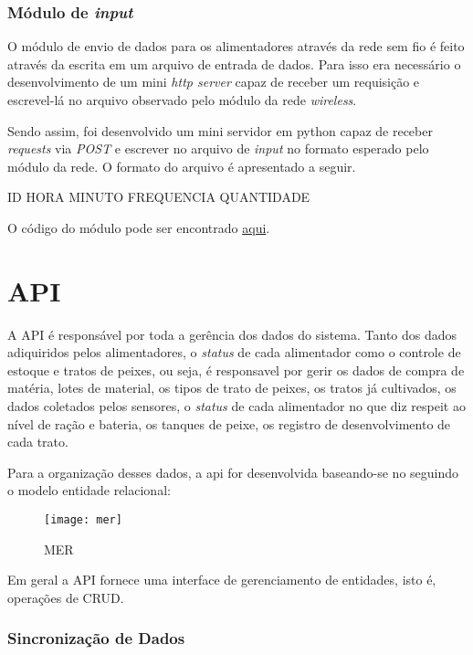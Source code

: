\subsubsection{Módulo de \textit{input}}

O módulo de envio de dados para os alimentadores através da rede sem fio é feito através da escrita em um arquivo de entrada de dados. Para isso era necessário o desenvolvimento de um mini \textit{http server} capaz de receber um requisição e escrevel-lá no arquivo observado pelo módulo da rede \textit{wireless}.

Sendo assim, foi desenvolvido um mini servidor em python capaz de receber \textit{requests} via \textit{POST} e escrever no arquivo de \textit{input} no formato esperado pelo módulo da rede. O formato do arquivo é apresentado a seguir.

ID HORA MINUTO FREQUENCIA QUANTIDADE

O código do módulo pode ser encontrado \href{https://github.com/PI2-Crema/parse-base-module}{aqui}.

\section{API}

A API é responsável por toda a gerência dos dados do sistema. Tanto dos dados adiquiridos pelos alimentadores, o \textit{status} de cada alimentador como o controle de estoque e tratos de peixes, ou seja, é responsavel por gerir os dados de compra de matéria, lotes de material, os tipos de trato de peixes, os tratos já cultivados, os dados coletados pelos sensores, o \textit{status} de cada alimentador no que diz respeit ao nível de ração e bateria, os tanques de peixe, os registro de desenvolvimento de cada trato.

Para a organização desses dados, a api for desenvolvida baseando-se no seguindo o modelo entidade relacional:

\begin{figure}[H]
    \centering
    \texttt{[image: mer]}
    \caption{MER}
    \label{fig:mer}
\end{figure}

Em geral a API fornece uma interface de gerenciamento de entidades, isto é, operações de CRUD.

\subsubsection{Sincronização de Dados}


